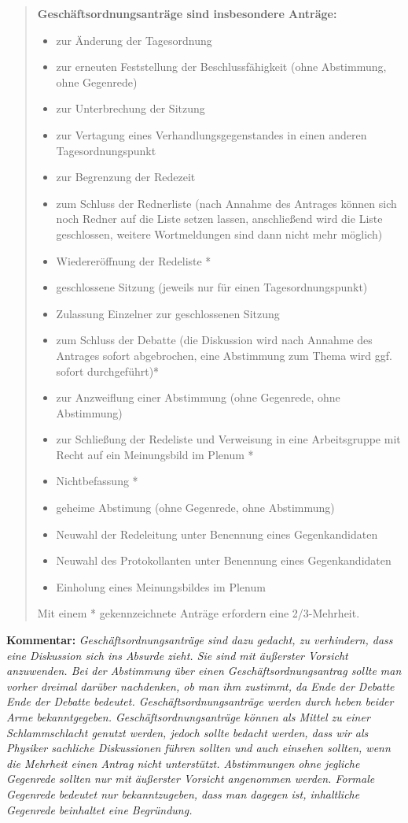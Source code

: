 \begin{enumerate}
\begin{quote}
\textbf{Geschäftsordnungsanträge sind insbesondere Anträge:}
\begin{itemize}
\item{zur Änderung der Tagesordnung}
\item{zur erneuten Feststellung der Beschlussfähigkeit (ohne Abstimmung, ohne Gegenrede)}
\item{zur Unterbrechung der Sitzung}
\item{zur Vertagung eines Verhandlungsgegenstandes in einen anderen Tagesordnungspunkt}
\item{zur Begrenzung der Redezeit}
\item{zum Schluss der Rednerliste (nach Annahme des Antrages können sich noch Redner auf die Liste
setzen lassen, anschließend wird die Liste geschlossen, weitere Wortmeldungen sind dann nicht
mehr möglich)}
\item{Wiedereröffnung der Redeliste *}
\item{geschlossene Sitzung (jeweils nur für einen Tagesordnungspunkt)}
\item{Zulassung Einzelner zur geschlossenen Sitzung}
\item{zum Schluss der Debatte (die Diskussion wird nach Annahme des Antrages sofort abgebrochen, eine
Abstimmung zum Thema wird ggf. sofort durchgeführt)*}
\item{zur Anzweiflung einer Abstimmung (ohne Gegenrede, ohne Abstimmung)}
\item{zur Schließung der Redeliste und Verweisung in eine Arbeitsgruppe mit Recht auf ein Meinungsbild im Plenum *}
\item{Nichtbefassung *}
\item{geheime Abstimung (ohne Gegenrede, ohne Abstimmung)}
\item{Neuwahl der Redeleitung unter Benennung eines Gegenkandidaten}
\item{Neuwahl des Protokollanten unter Benennung eines Gegenkandidaten}
\item{Einholung eines Meinungsbildes im Plenum}

\end{itemize}
Mit einem * gekennzeichnete Anträge erfordern eine 2/3-Mehrheit.
\end{quote}
\end{enumerate}
\textbf{Kommentar:} {\footnotesize\textit{Geschäftsordnungsanträge
sind dazu gedacht, zu verhindern, dass eine Diskussion sich ins
Absurde zieht. Sie sind mit äußerster Vorsicht anzuwenden. Bei der
Abstimmung über einen Geschäftsordnungsantrag sollte man vorher
dreimal darüber nachdenken, ob man ihm zustimmt, da Ende der Debatte
Ende der Debatte bedeutet. Geschäftsordnungsanträge werden durch
heben beider Arme bekanntgegeben. Geschäftsordnungsanträge können
als Mittel zu einer Schlammschlacht genutzt werden, jedoch sollte
bedacht werden, dass wir als Physiker sachliche Diskussionen führen
sollten und auch einsehen sollten, wenn die Mehrheit einen Antrag
nicht unterstützt. Abstimmungen ohne jegliche Gegenrede sollten nur
mit äußerster Vorsicht angenommen werden. Formale Gegenrede bedeutet
nur bekanntzugeben, dass man dagegen ist,
inhaltliche Gegenrede beinhaltet eine Begründung.}}\\[1ex]

